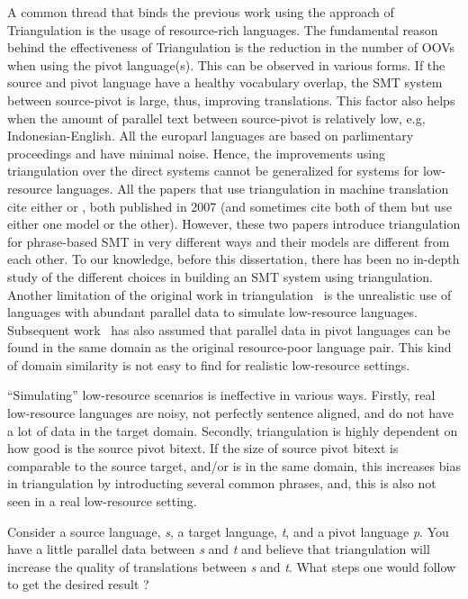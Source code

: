  
 A common thread that binds the previous work using the approach of Triangulation is the usage of resource-rich languages. The fundamental reason behind the effectiveness of Triangulation is the reduction in the number of OOVs when using the pivot language(s). This can be observed in various forms. If the source and pivot language have a healthy vocabulary overlap, the SMT system between source-pivot is large, thus, improving translations. This factor also helps when the amount of parallel text between source-pivot is relatively low, e.g, Indonesian-English.  All the europarl languages are based on parlimentary proceedings and have minimal noise. Hence, the improvements using triangulation over the direct systems cannot be generalized for systems for low-resource languages. All the papers that use triangulation in machine translation cite either \cite{Utiyama:07} or \cite{Cohn:07}, both published in 2007 (and sometimes cite both of them but use either one model or the other). However, these two papers introduce triangulation for phrase-based SMT in very different ways and their models are different from each other. To our knowledge, before this dissertation, there has been no in-depth study of the different choices in building an SMT system using triangulation. Another limitation of the original work in triangulation~\cite{Utiyama:07,Cohn:07} is the unrealistic use of languages with abundant parallel data to simulate low-resource languages. Subsequent work~\cite{Nakov:12,Nakovemnlp:12,Gispert:06,Huck:12} has also assumed that parallel data in pivot languages can be found in the same domain as the original resource-poor language pair. This kind of domain similarity is not easy to find for realistic low-resource settings.

 ``Simulating'' low-resource scenarios is ineffective in various ways. Firstly, real low-resource languages are noisy, not perfectly sentence aligned, and do not have a lot of data in the target domain. Secondly, triangulation is highly dependent on how good is the source pivot bitext. If the size of source pivot bitext is comparable to the source target, and/or is in the same domain, this increases bias in triangulation by introducting several common phrases, and, this is also not seen in a real low-resource setting.


 Consider a source language, \emph{s}, a target language, \emph{t}, and a pivot language \emph{p}. You have a little parallel data between \emph{s} and \emph{t} and believe that triangulation will increase the quality of translations between \emph{s} and \emph{t}. What steps one would follow to get the desired result ?

